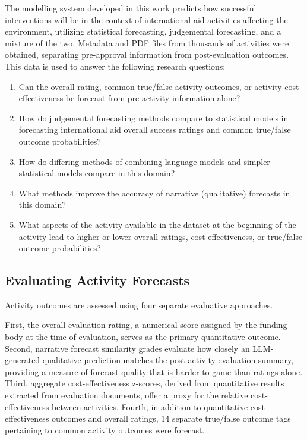 \documentclass[12pt,a4paper]{article}
\begin{document}
The modelling system developed in this work predicts how successful interventions will be in the context of international aid activities affecting the environment, utilizing statistical forecasting, judgemental forecasting, and a mixture of the two. Metadata and PDF files from thousands of activities were obtained, separating pre-approval information from post-evaluation outcomes. This data is used to answer the following research questions:
\begin{enumerate}
  \item Can the overall rating, common true/false activity outcomes, or activity cost-effectiveness be forecast from pre-activity information alone?
  \item How do judgemental forecasting methods compare to statistical models in forecasting international aid overall success ratings and common true/false outcome probabilities?
  \item How do differing methods of combining language models and simpler statistical models compare in this domain?
  \item What methods improve the accuracy of narrative (qualitative) forecasts in this domain?
  \item What aspects of the activity available in the dataset at the beginning of the activity lead to higher or lower overall ratings, cost-effectiveness, or true/false outcome probabilities?
\end{enumerate}



\subsection{Evaluating Activity Forecasts}

Activity outcomes are assessed using four separate evaluative approaches.

First, the overall evaluation rating, a numerical score assigned by the funding body at the time of evaluation, serves as the primary quantitative outcome. Second, narrative forecast similarity grades evaluate how closely an LLM-generated qualitative prediction matches the post-activity evaluation summary, providing a measure of forecast quality that is harder to game than ratings alone. Third, aggregate cost-effectiveness z-scores, derived from quantitative results extracted from evaluation documents, offer a proxy for the relative cost-effectiveness between activities. Fourth, in addition to quantitative cost-effectiveness outcomes and overall ratings, 14 separate true/false outcome tags pertaining to common activity outcomes were forecast.
\end{document}
